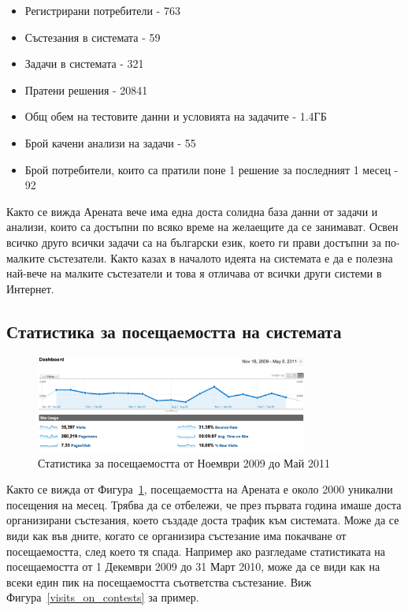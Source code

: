 \documentclass[a4paper,12pt]{article}
\begin{document}
  \begin{itemize}
    \item Регистрирани потребители - 763
    \item Състезания в системата - 59
    \item Задачи в системата - 321
    \item Пратени решения - 20841
    \item Общ обем на тестовите данни и условията на задачите - 1.4ГБ
    \item Брой качени анализи на задачи - 55
    \item Брой потребители, които са пратили поне 1 решение за последният 1 месец - 92
  \end{itemize}
  
  Както се вижда Арената вече има една доста солидна база данни от задачи и анализи, които са достъпни по всяко време на желаещите да се занимават. Освен всичко друго всички задачи са на български език, което ги прави достъпни за по-малките състезатели. Както казах в началото идеята на системата е да е полезна най-вече на малките състезатели и това я отличава от всички други системи в Интернет.
  
  \pagebreak
  
  \subsection{Статистика за посещаемостта на системата}
  \begin{figure}
    \begin{center}
      \includegraphics[width=0.8\textwidth]{images/visitors_stats.png}
    \end{center}
    \caption{Статистика за посещаемостта от Ноември 2009 до Май 2011}
    \label{visitors_stats}
  \end{figure}
  
  Както се вижда от Фигура~\ref{visitors_stats}, посещаемостта на Арената е около 2000 уникални посещения на месец. Трябва да се отбележи, че през първата година имаше доста организирани състезания, което създаде доста трафик към системата. Може да се види как във дните, когато се организира състезание има покачване от посещаемостта, след което тя спада. Например ако разгледаме статистиката на посещаемостта от 1 Декември 2009 до 31 Март 2010, може да се види как на всеки един пик на посещаемостта съответства състезание. Виж Фигура~\ref{visits_on_contests} за пример.
\end{document}

